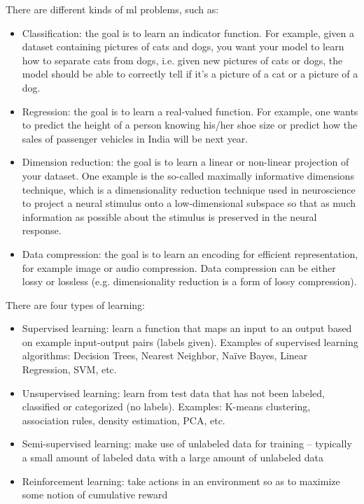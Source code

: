 \documentclass[parskip=half,notes,cadrem,toolver]{iisvlsi}
\begin{document}
There are different kinds of \gls{ml} problems, such as:
\begin{itemize}
    \item Classification: the goal is to learn an indicator function. For example, given a dataset containing pictures of cats and dogs, you want your model to learn how to separate cats from dogs, i.e. given new pictures of cats or dogs, the model should be able to correctly tell if it's a picture of a cat or a picture of a dog.
    \item Regression: the goal is to learn a real-valued function. For example, one wants to predict the height of a person knowing his/her shoe size or predict how the sales of passenger vehicles in India will be next year.
    \item Dimension reduction: the goal is to learn a linear or non-linear projection of your dataset. One example is the so-called maximally informative dimensions technique, which is a dimensionality reduction technique used in neuroscience to project a neural stimulus onto a low-dimensional subspace so that as much information as possible about the stimulus is preserved in the neural response.
    \item Data compression: the goal is to learn an encoding for efficient representation, for example image or audio compression. Data compression can be either lossy or lossless (e.g. dimensionality reduction is a form of lossy compression).
\end{itemize}

There are four types of learning:
\begin{itemize}
    \item Supervised learning: learn a function that maps an input to an output based on example input-output pairs (labels given). Examples of supervised learning algorithms: Decision Trees, Nearest Neighbor, Naïve Bayes, Linear Regression, SVM, etc.
    \item Unsupervised learning: learn from test data that has not been labeled, classified or categorized (no labels). Examples: K-means clustering, association rules, density estimation, PCA, etc.
    \item Semi-supervised learning: make use of unlabeled data for training – typically a small amount of labeled data with a large amount of unlabeled data
    \item Reinforcement learning: take actions in an environment so as to maximize some notion of cumulative reward
\end{itemize}
\end{document}
